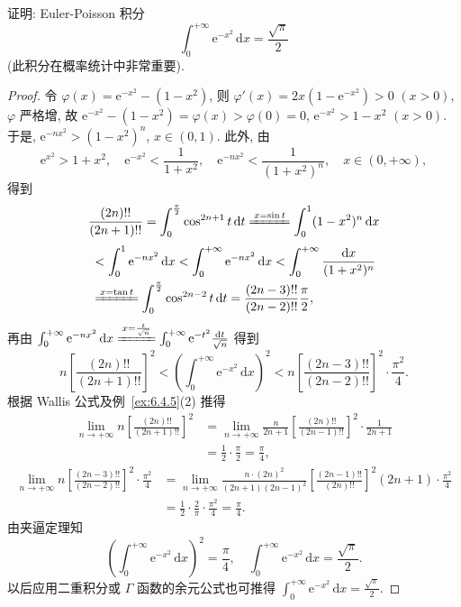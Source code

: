 \begin{example}\label{ex:6.5.7}
证明: Euler-Poisson 积分
\[
\int_{0}^{+\infty}\mathrm{e}^{-x^{2}}\,\mathrm{d}x=\frac{\sqrt{\pi}}{2}
\]
(此积分在概率统计中非常重要).
\end{example}

\begin{proof}
令 $\varphi(x)=\mathrm{e}^{-x^{2}}-(1-x^{2})$, 则 $\varphi'(x)=2x(1-\mathrm{e}^{-x^{2}})>0$ $(x>0)$, $\varphi$ 严格增, 故 $\mathrm{e}^{-x^{2}}-(1-x^{2})=\varphi(x)>\varphi(0)=0$, $\mathrm{e}^{-x^{2}}>1-x^{2}$ $(x>0)$. 于是, $\mathrm{e}^{-nx^{2}}>(1-x^{2})^{n}$, $x\in(0,1)$. 此外, 由
\[
\mathrm{e}^{x^{2}}>1+x^{2},\quad\mathrm{e}^{-x^{2}}<\frac{1}{1+x^{2}},\quad\mathrm{e}^{-nx^{2}}<\frac{1}{\left(1+x^{2}\right)^{n}},\quad x\in(0,+\infty),
\]
得到
\[
\frac{(2n)!!}{(2n+1)!!}=\int_{0}^{\frac{\pi}{2}}\cos^{2n+1}t\,\mathrm{d}t\xlongequal{x=\sin t}\int_{0}^{1}(1-x^{2})^{n}\,\mathrm{d}x
\]
\begin{align*}
&<\int_{0}^{1}\mathrm{e}^{-nx^{2}}\,\mathrm{d}x<\int_{0}^{+\infty}\mathrm{e}^{-nx^{2}}\,\mathrm{d}x<\int_{0}^{+\infty}\frac{\mathrm{d}x}{(1+x^{2})^{n}}\\
&\xlongequal{x=\tan t}\int_{0}^{\frac{\pi}{2}}\cos^{2n-2}t\,\mathrm{d}t=\frac{(2n-3)!!}{(2n-2)!!}\frac{\pi}{2},
\end{align*}
再由 $\int_{0}^{+\infty}\mathrm{e}^{-nx^{2}}\,\mathrm{d}x\xlongequal{x=\frac{t}{\sqrt{n}}}\int_{0}^{+\infty}\mathrm{e}^{-t^{2}}\frac{\mathrm{d}t}{\sqrt{n}}$ 得到
\[
n\left[\frac{(2n)!!}{(2n+1)!!}\right]^{2}<\left(\int_{0}^{+\infty}\mathrm{e}^{-x^{2}}\,\mathrm{d}x\right)^{2}<n\left[\frac{(2n-3)!!}{(2n-2)!!}\right]^{2}\cdot\frac{\pi^{2}}{4}.
\]
根据 Wallis 公式及例~\ref{ex:6.4.5}(2) 推得
\begin{align*}
\lim_{n\to+\infty}n\left[\frac{(2n)!!}{(2n+1)!!}\right]^{2}&=\lim_{n\to+\infty}\frac{n}{2n+1}\left[\frac{(2n)!!}{(2n-1)!!}\right]^{2}\cdot\frac{1}{2n+1}\\
&=\frac{1}{2}\cdot\frac{\pi}{2}=\frac{\pi}{4},
\end{align*}
\begin{align*}
\lim_{n\to+\infty}n\left[\frac{(2n-3)!!}{(2n-2)!!}\right]^{2}\cdot\frac{\pi^{2}}{4}&=\lim_{n\to+\infty}\frac{n\cdot(2n)^{2}}{(2n+1)(2n-1)^{2}}\left[\frac{(2n-1)!!}{(2n)!!}\right]^{2}(2n+1)\cdot\frac{\pi^{2}}{4}\\
&=\frac{1}{2}\cdot\frac{2}{\pi}\cdot\frac{\pi^{2}}{4}=\frac{\pi}{4}.
\end{align*}
由夹逼定理知
\[
\left(\int_{0}^{+\infty}\mathrm{e}^{-x^{2}}\,\mathrm{d}x\right)^{2}=\frac{\pi}{4},\quad\int_{0}^{+\infty}\mathrm{e}^{-x^{2}}\,\mathrm{d}x=\frac{\sqrt{\pi}}{2}.
\]
以后应用二重积分或 $\Gamma$ 函数的余元公式也可推得 $\int_{0}^{+\infty}\mathrm{e}^{-x^{2}}\,\mathrm{d}x=\frac{\sqrt{\pi}}{2}$.
\end{proof}

